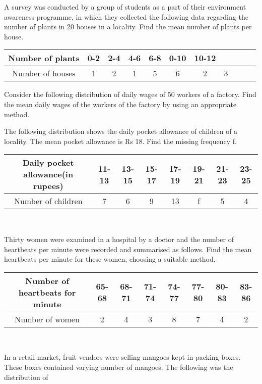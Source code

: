 \item A survey was conducted by a group of students as a part of their environment awareness
programme, in which they collected the following data regarding the number of plants in
20 houses in a locality. Find the mean number of plants per house.\\
\begin{tabular}{|c|c|c|c|c|c|c||c|c|c|c|}
\hline
Number of plants &0-2&2-4&4-6&6-8&0-10&10-12\\
\hline
Number of houses&1&2&1&5&6&2&3\\
\hline
\end{tabular}
\item Consider the following distribution of daily wages of 50 workers of a factory.
Find the mean daily wages of the workers of the factory by using an appropriate method.
\item The following distribution shows the daily pocket allowance of children of a locality.
The mean pocket allowance is Rs 18. Find the missing frequency f.
\begin{tabular}{|c|c|c|c|c|c|c|c|}
\hline
Daily pocket allowance(in rupees) &11-13&13-15&15-17&17-19&19-21&21-23&23-25\\
\hline
Number of children&7&6&9&13&f&5&4\\
\hline
\end{tabular}\\
\item Thirty women were examined in a hospital by a doctor and the number of heartbeats per
minute were recorded and summarised as follows. Find the mean heartbeats per minute
for these women, choosing a suitable method.
\begin{tabular}{|c|c|c|c|c|c|c|c|}
\hline
Number of heartbeats for minute &65-68&68-71&71-74&74-77&77-80&80-83&83-86\\
\hline
Number of women&2&4&3&8&7&4&2\\
\hline
\end{tabular}\\
\item In a retail market, fruit vendors were selling mangoes kept in packing boxes. These
boxes contained varying number of mangoes. The following was the distribution of
